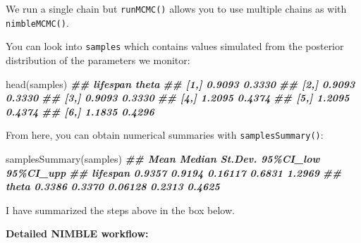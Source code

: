\documentclass[
  12pt,
]{krantz}
\newenvironment{Shaded}{\begin{snugshade}}{\end{snugshade}}
\newcommand{\DocumentationTok}[1]{\textcolor[rgb]{0.56,0.35,0.01}{\textbf{\textit{#1}}}}
\newcommand{\FunctionTok}[1]{\textcolor[rgb]{0.00,0.00,0.00}{#1}}
\newcommand{\NormalTok}[1]{#1}
\begin{document}
We run a single chain but \texttt{runMCMC()} allows you to use multiple chains as with \texttt{nimbleMCMC()}.

You can look into \texttt{samples} which contains values simulated from the posterior distribution of the parameters we monitor:

\begin{Shaded}
\begin{Highlighting}[]
\FunctionTok{head}\NormalTok{(samples)}
\DocumentationTok{\#\#      lifespan  theta}
\DocumentationTok{\#\# [1,]   0.9093 0.3330}
\DocumentationTok{\#\# [2,]   0.9093 0.3330}
\DocumentationTok{\#\# [3,]   0.9093 0.3330}
\DocumentationTok{\#\# [4,]   1.2095 0.4374}
\DocumentationTok{\#\# [5,]   1.2095 0.4374}
\DocumentationTok{\#\# [6,]   1.1835 0.4296}
\end{Highlighting}
\end{Shaded}

From here, you can obtain numerical summaries with \texttt{samplesSummary()}:

\begin{Shaded}
\begin{Highlighting}[]
\FunctionTok{samplesSummary}\NormalTok{(samples)}
\DocumentationTok{\#\#            Mean Median St.Dev. 95\%CI\_low 95\%CI\_upp}
\DocumentationTok{\#\# lifespan 0.9357 0.9194 0.16117    0.6831    1.2969}
\DocumentationTok{\#\# theta    0.3386 0.3370 0.06128    0.2313    0.4625}
\end{Highlighting}
\end{Shaded}

I have summarized the steps above in the box below.

\textbf{Detailed NIMBLE workflow:}
\end{document}

